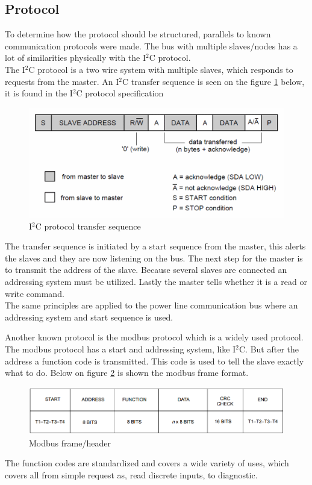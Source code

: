 \subsection{Protocol}
To determine how the protocol should be structured, parallels to known communication protocols were made. The bus with multiple slaves/nodes has a lot of similarities physically with the I$^2$C protocol.\\
The I$^2$C protocol is a two wire system with multiple slaves, which responds to requests from the master. An I$^2$C transfer sequence is seen on the figure \ref{fig:i2cheader} below, it is found in the I$^2$C protocol specification 
\begin{figure}[H]
	\centering
	\includegraphics[width=.8\textwidth]{billeder/10technologystudies/7-bit-address-writing}
	\caption{I$^2$C protocol transfer sequence}
	\label{fig:i2cheader}
\end{figure}
The transfer sequence is initiated by a start sequence from the master, this alerts the slaves and they are now listening on the bus. The next step for the master is to transmit the address of the slave. Because several slaves are connected an addressing system must be utilized. Lastly the master tells whether it is a read or write command. \\
The same principles are applied to the power line communication bus where an addressing system and start sequence is used.

Another known protocol is the modbus protocol which is a widely used protocol. The modbus protocol has a start and addressing system, like I$^2$C. But after the address a function code is transmitted. This code is used to tell the slave exactly what to do. Below on figure \ref{fig:modbusframe} is shown the modbus frame format.
\begin{figure}[H]
	\centering
	\includegraphics[width=.8\textwidth]{billeder/10technologystudies/modbusframe}
	\caption{Modbus frame/header}
	\label{fig:modbusframe}
\end{figure}
The function codes are standardized and covers a wide variety of uses, which covers all from simple request as, read discrete inputs, to diagnostic.
